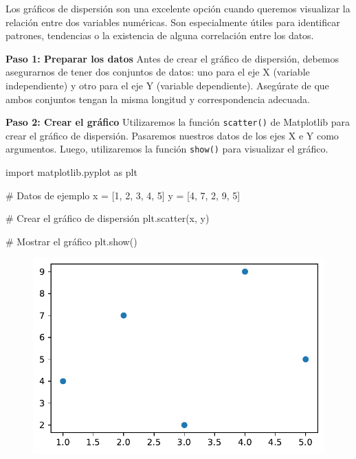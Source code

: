 \documentclass[
  a4paper,
]{article}
\newenvironment{Shaded}{}{}
\newcommand{\CommentTok}[1]{\textcolor[rgb]{0.42,0.45,0.49}{#1}}
\newcommand{\DecValTok}[1]{\textcolor[rgb]{0.00,0.36,0.77}{#1}}
\newcommand{\ImportTok}[1]{\textcolor[rgb]{0.01,0.18,0.38}{#1}}
\newcommand{\NormalTok}[1]{\textcolor[rgb]{0.14,0.16,0.18}{#1}}
\newcommand{\OperatorTok}[1]{\textcolor[rgb]{0.14,0.16,0.18}{#1}}
\begin{document}
Los gráficos de dispersión son una excelente opción cuando queremos
visualizar la relación entre dos variables numéricas. Son especialmente
útiles para identificar patrones, tendencias o la existencia de alguna
correlación entre los datos.

\textbf{Paso 1: Preparar los datos} Antes de crear el gráfico de
dispersión, debemos asegurarnos de tener dos conjuntos de datos: uno
para el eje X (variable independiente) y otro para el eje Y (variable
dependiente). Asegúrate de que ambos conjuntos tengan la misma longitud
y correspondencia adecuada.

\textbf{Paso 2: Crear el gráfico} Utilizaremos la función
\texttt{scatter()} de Matplotlib para crear el gráfico de dispersión.
Pasaremos nuestros datos de los ejes X e Y como argumentos. Luego,
utilizaremos la función \texttt{show()} para visualizar el gráfico.

\begin{Shaded}
\begin{Highlighting}[]
\ImportTok{import}\NormalTok{ matplotlib.pyplot }\ImportTok{as}\NormalTok{ plt}

\CommentTok{\# Datos de ejemplo}
\NormalTok{x }\OperatorTok{=}\NormalTok{ [}\DecValTok{1}\NormalTok{, }\DecValTok{2}\NormalTok{, }\DecValTok{3}\NormalTok{, }\DecValTok{4}\NormalTok{, }\DecValTok{5}\NormalTok{]}
\NormalTok{y }\OperatorTok{=}\NormalTok{ [}\DecValTok{4}\NormalTok{, }\DecValTok{7}\NormalTok{, }\DecValTok{2}\NormalTok{, }\DecValTok{9}\NormalTok{, }\DecValTok{5}\NormalTok{]}

\CommentTok{\# Crear el gráfico de dispersión}
\NormalTok{plt.scatter(x, y)}

\CommentTok{\# Mostrar el gráfico}
\NormalTok{plt.show()}
\end{Highlighting}
\end{Shaded}

\begin{figure}[H]

{\centering \includegraphics{index_files/figure-pdf/cell-4-output-1.pdf}

}

\end{figure}
\end{document}
